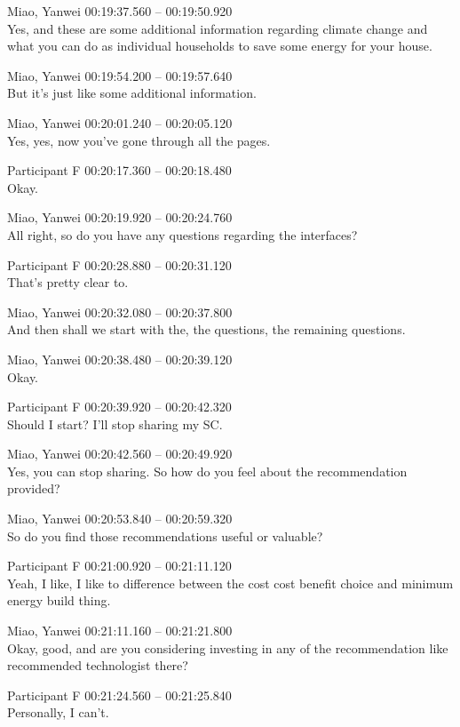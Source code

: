 {Miao, Yanwei 00:19:37.560 -- 00:19:50.920 \\
Yes, and these are some additional information regarding climate change and what you can do as individual households to save some energy for your house.

Miao, Yanwei 00:19:54.200 -- 00:19:57.640 \\
But it's just like some additional information.

Miao, Yanwei 00:20:01.240 -- 00:20:05.120 \\
Yes, yes, now you've gone through all the pages.

Participant F 00:20:17.360 -- 00:20:18.480 \\
Okay.

Miao, Yanwei 00:20:19.920 -- 00:20:24.760 \\
All right, so do you have any questions regarding the interfaces?

Participant F 00:20:28.880 -- 00:20:31.120 \\
That's pretty clear to.

Miao, Yanwei 00:20:32.080 -- 00:20:37.800 \\
And then shall we start with the, the questions, the remaining questions.

Miao, Yanwei 00:20:38.480 -- 00:20:39.120 \\
Okay.

Participant F 00:20:39.920 -- 00:20:42.320 \\
Should I start? I'll stop sharing my SC.

Miao, Yanwei 00:20:42.560 -- 00:20:49.920 \\
Yes, you can stop sharing. So how do you feel about the recommendation provided?

Miao, Yanwei 00:20:53.840 -- 00:20:59.320 \\
So do you find those recommendations useful or valuable?

Participant F 00:21:00.920 -- 00:21:11.120 \\
Yeah, I like, I like to difference between the cost cost benefit choice and minimum energy build thing.

Miao, Yanwei 00:21:11.160 -- 00:21:21.800 \\
Okay, good, and are you considering investing in any of the recommendation like recommended technologist there?

Participant F 00:21:24.560 -- 00:21:25.840 \\
Personally, I can't.

}

